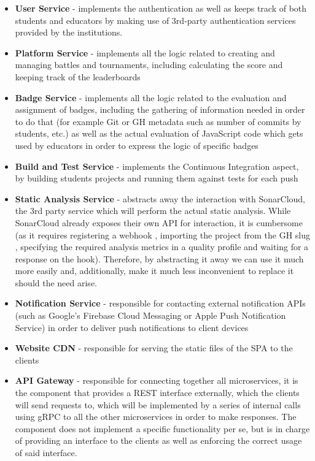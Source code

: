 \begin{itemize}
    \item \textbf{User Service} {-} implements the authentication as well as keeps track of both students and educators by making
          use of 3rd-party authentication services provided by the institutions.
    \item \textbf{Platform Service} {-} implements all the logic related to creating and managing battles and tournaments, including
          calculating the score and keeping track of the leaderboards
    \item \textbf{Badge Service} {-} implements all the logic related to the evaluation and assignment of badges, including the gathering
          of information needed in order to do that (for example Git or GH metadata such as number of commits by students, etc.)
          as well as the actual evaluation of JavaScript code which gets used by educators in order to express the logic of
          specific badges
    \item \textbf{Build and Test Service} {-} implements the Continuous Integration aspect, by building students projects and
          running them against tests for each push
    \item \textbf{Static Analysis Service} {-} abstracts away the interaction with SonarCloud, the 3rd party service which will
          perform the actual static analysis. While SonarCloud already exposes their own API for interaction, it is cumbersome
          (as it requires registering a webhook \cite{SonarCloudWh}, importing the project from the GH slug \cite{SonarCloudGh},
          specifying the required analysis metrics in a quality profile \cite{SonarCloudQp} and waiting for a response on the hook).
          Therefore, by abstracting it away we can use it much more easily and, additionally, make it much less inconvenient to
          replace it should the need arise.
    \item \textbf{Notification Service} {-} responsible for contacting external notification APIs
          (such as Google's Firebase Cloud Messaging or Apple Push Notification Service) in order to deliver push notifications
          to client devices
    \item \textbf{Website CDN} {-} responsible for serving the static files of the SPA to the clients
    \item \textbf{API Gateway} {-} responsible for connecting together all microservices, it is the component that provides a REST
          interface externally, which the clients will send requests to, which will be implemented by a series of internal calls
          using gRPC \cite{gRPC} to all the other microservices in order to make responses. The component does not implement a specific
          functionality per se, but is in charge of providing an interface to the clients as well as enforcing the correct usage
          of said interface.
\end{itemize}

